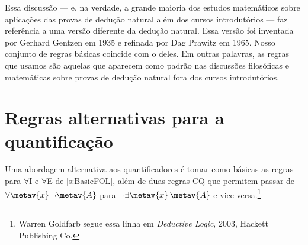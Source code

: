 Essa discussão — e, na verdade, a grande maioria dos estudos matemáticos sobre aplicações das provas de dedução natural além dos cursos introdutórios — faz referência a uma versão diferente da dedução natural. Essa versão foi inventada por Gerhard Gentzen em 1935 e refinada por Dag Prawitz em 1965. Nosso conjunto de regras básicas coincide com o deles. Em outras palavras, as regras que usamos são aquelas que aparecem como padrão nas discussões filosóficas e matemáticas sobre provas de dedução natural fora dos cursos introdutórios.



\section{Regras alternativas para a quantificação}
Uma abordagem alternativa aos quantificadores é tomar como básicas as regras para $\forall$I e $\forall$E de \cref{s:BasicFOL}, além de duas regras CQ que permitem passar de $\forall \metav{x}\, \enot \metav{A}$ para $\enot \exists \metav{x}\, \metav{A}$ e vice-versa.\footnote{Warren Goldfarb segue essa linha em \textit{Deductive Logic}, 2003, Hackett Publishing Co.}

